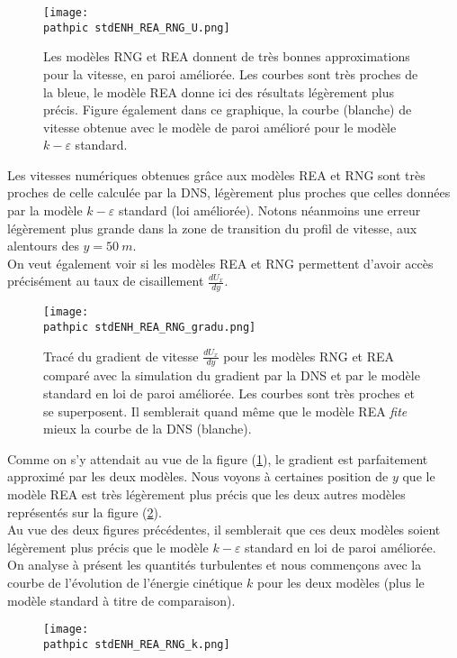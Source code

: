 \documentclass[a4paper,10pt]{article}
\newcommand\pathpic{/home/saura/Documents/Latex_files/Pic/}
\newcommand{\keps}{$k-\varepsilon$}
\begin{document}
 \begin{figure}[ht!]
 \centering
 \texttt{[image: \\pathpic stdENH\_REA\_RNG\_U.png]}
 \caption{\footnotesize{Les modèles RNG et REA donnent de très bonnes approximations pour la vitesse, en paroi améliorée. Les courbes sont très proches de la bleue, le modèle REA donne ici des résultats légèrement plus précis. Figure également dans ce graphique, la courbe (blanche) de vitesse obtenue avec le modèle de paroi amélioré pour le modèle \keps $ $ standard.}}
 \label{RNG_REA_Ux}
 \end{figure}
Les vitesses numériques obtenues grâce aux modèles REA et RNG sont très proches de celle calculée par la DNS, légèrement plus proches que celles données par la modèle \keps $ $ standard  (loi améliorée). Notons néanmoins une erreur légèrement plus grande dans la zone de transition du profil de vitesse, aux alentours des $y = 50 \ m$.  \\

\noindent On veut également voir si les modèles REA et RNG permettent d'avoir accès précisément au taux de cisaillement $\frac{dU_x}{dy}$.

\begin{figure}[ht!]
\centering
\texttt{[image: \\pathpic stdENH\_REA\_RNG\_gradu.png]}
\caption{Tracé du gradient de vitesse $\frac{dU_x}{dy}$ pour les modèles RNG et REA comparé avec la simulation du gradient par la DNS et par le modèle standard en loi de paroi améliorée. Les courbes sont très proches et se superposent. Il semblerait quand même que le modèle REA \textit{fite} mieux la courbe de la DNS (blanche).}
\label{REA_RNG_gradu}
\end{figure}

 \noindent Comme on s'y attendait au vue de la figure (\ref{RNG_REA_Ux}), le gradient est parfaitement approximé par les deux modèles. Nous voyons à certaines position de $y$ que le modèle REA est très légèrement plus précis que les deux autres modèles représentés sur la figure (\ref{REA_RNG_gradu}). \\
 Au vue des deux figures précédentes, il semblerait que ces deux modèles soient légèrement plus précis que le modèle \keps $ $ standard en loi de paroi améliorée. \\
On analyse à présent les quantités turbulentes et nous commençons avec la courbe de l'évolution de l'énergie cinétique $k$ pour les deux modèles (plus le modèle standard à titre de comparaison).
 \begin{figure}[ht!]
\centering
\texttt{[image: \\pathpic stdENH\_REA\_RNG\_k.png]}
\caption{}
\label{REA_RNG_k}
\end{figure}
\end{document}
